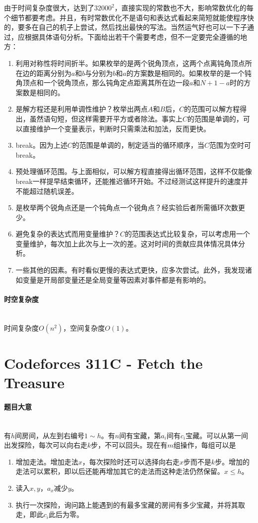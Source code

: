 \documentclass[UTF8]{ctexart}
\newcommand{\myparagraph}[1]{\paragraph{#1}\mbox{}\\}
\theoremstyle{nonumberplain}
\begin{document}
			由于时间复杂度很大，达到了$32000^2$，直接实现的常数也不大，影响常数优化的每个细节都要考虑。并且，有时常数优化不是语句和表达式看起来简短就能使程序快的，要多在自己的机子上尝试，然后找出最快的写法。当然运气好也可以一下子通过，应根据具体语句分析。下面给出若干个需要考虑，但不一定要完全遵循的地方：
			
			\begin{enumerate}
				\item 利用对称性将时间折半。如果枚举的是两个锐角顶点，这两个点离钝角顶点所在边的距离分别为$a$和$b$与分别为$b$和$a$的方案数是相同的。如果枚举的是一个钝角顶点和一个锐角顶点，那么钝角定点距离其所在边一段$a$和$N+1-a$时的方案数是相同的。
				\item 是解方程还是利用单调性维护？枚举出两点$A$和$B$后，$C$的范围可以解方程得出，虽然语句短，但这样需要开平方或者除法。事实上$C$的范围是单调的，可以直接维护一个变量表示，判断时只需乘法和加法，反而更快。
				\item break。因为上述$C$的范围是单调的，制定适当的循环顺序，当$C$范围为空时可break。
				\item 预处理循环范围。与上面相似，可以解方程直接得出循环范围，这样不仅能像break一样提早结束循环，还能推迟循环开始。不过经测试这样提升的速度并不能超过随机误差。
				\item 是枚举两个锐角点还是一个钝角点一个锐角点？经实验后者所需循环次数更少。
				\item 避免复杂的表达式而用变量维护？$C$的范围表达式比较复杂，可以考虑用一个变量维护，每次加上此次与上一次的差。这对时间的贡献应具体情况具体分析。
				\item 一些其他的因素。有时看似更慢的表达式更快，应多次尝试。此外，我发现诸如变量是开局部变量还是全局变量等因素对事件都是有影响的。
				
			\end{enumerate}
		
		\myparagraph{时空复杂度}
		
			时间复杂度$O(n^2)$，空间复杂度$O(1)$。
	
	\section{Codeforces 311C - Fetch the Treasure}
	
		\myparagraph{题目大意}
		
			有$h$间房间，从左到右编号$1 \sim h$。有$n$间有宝藏，第$a_i$间有$c_i$宝藏。可以从第一间出发探险，每次可以向右走$k$步，不可以回头。现在有$m$组操作，每组可以是
			
			\begin{enumerate}
				\item 增加走法。增加走法$x$，每次探险时还可以选择向右走$x$步而不是$k$步。增加的走法可以累积，即以后还能再增加其它的走法而这种走法仍然保留。$x \leq h$。
				\item 读入$x,y$，$a_x$减少$y$。
				\item 执行一次探险，询问路上能遇到的有最多宝藏的房间有多少宝藏，并将其取走，即此$c_i$此后为零。
			\end{enumerate}
			
\end{document}
